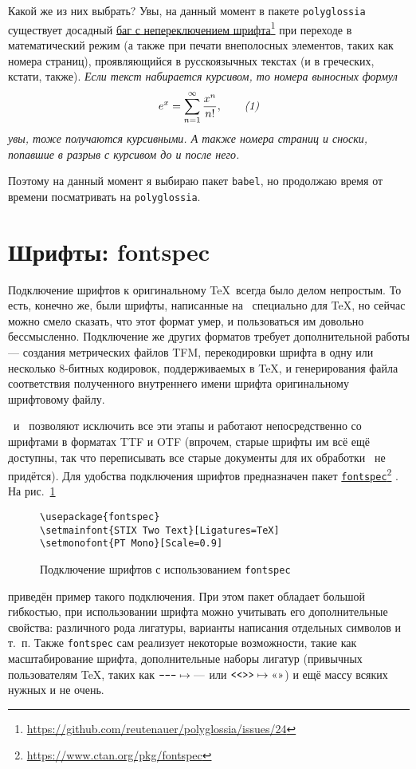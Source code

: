 \documentclass[a4paper,12pt]{article}
\newcommand\foothref[2]{%
  \href{#1}{#2}\footnote{\url{#1}}%
}
\newcommand\package[1]{\texttt{#1}}
\begin{document}
Какой же из них выбрать? Увы, на данный момент в пакете \package{polyglossia}
существует досадный \foothref{https://github.com/reutenauer/polyglossia/issues/24}{баг
с непереключением шрифта} при переходе в математический
режим (а также при печати внеполосных элементов, таких как номера страниц),
проявляющийся в русскоязычных текстах (и в греческих, кстати, также).
{\itshape Если текст набирается курсивом, то номера выносных формул
\begin{equation}
e^x=\sum_{n=1}^\infty\frac{x^n}{n!},\tag*{\textit{(1)}}
\end{equation}
увы, тоже получаются курсивными. А также номера страниц и сноски, попавшие
в разрыв с курсивом до и после него.}

Поэтому на данный момент я выбираю пакет \package{babel}, но продолжаю время
от времени посматривать на \package{polyglossia}.

\section{Шрифты: fontspec}
Подключение шрифтов к оригинальному \TeX\ всегда было делом непростым.
То есть, конечно же, были шрифты, написанные на \METAFONT\ специально для
\TeX, но сейчас можно смело сказать, что этот формат умер, и пользоваться
им довольно бессмысленно. Подключение же других форматов требует
дополнительной работы --- создания метрических файлов TFM, перекодировки
шрифта в одну или несколько 8-битных кодировок, поддерживаемых в \TeX,
и генерирования файла соответствия полученного внутреннего имени шрифта
оригинальному шрифтовому файлу.

\XeTeX\ и \LuaTeX\ позволяют исключить все эти этапы и работают
непосредственно со шрифтами в форматах TTF и OTF (впрочем, старые
шрифты им всё ещё доступны, так что переписывать все старые документы для
их обработки \LuaLaTeX\ не придётся). Для удобства подключения шрифтов
предназначен пакет \foothref{https://www.ctan.org/pkg/fontspec}{\package{fontspec}}.
На рис.~\ref{fontspec1}
\begin{figure}[tp]
\begin{tcolorbox}
\footnotesize
\begin{verbatim}
\usepackage{fontspec}
\setmainfont{STIX Two Text}[Ligatures=TeX]
\setmonofont{PT Mono}[Scale=0.9]
\end{verbatim}
\end{tcolorbox}
\caption{Подключение шрифтов с использованием
\package{fontspec}}\label{fontspec1}
\end{figure}
приведён пример такого подключения. При этом пакет обладает большой
гибкостью, при использовании шрифта можно учитывать его дополнительные
свойства: различного рода лигатуры, варианты написания отдельных
символов и т.~п. Также \package{fontspec} сам реализует некоторые
возможности, такие как масштабирование шрифта, дополнительные наборы
лигатур (привычных пользователям \TeX, таких как
$\verb|---|\mapsto\text{---}$ или $\verb|<<>>|\mapsto\text{<<>>}$)
и ещё массу всяких нужных и не очень.
\end{document}
